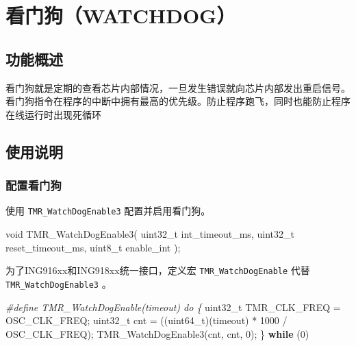\documentclass[
  12pt,
]{book}
\newenvironment{Shaded}{\begin{snugshade}}{\end{snugshade}}
\newcommand{\ControlFlowTok}[1]{\textcolor[rgb]{0.13,0.29,0.53}{\textbf{#1}}}
\newcommand{\DataTypeTok}[1]{\textcolor[rgb]{0.13,0.29,0.53}{#1}}
\newcommand{\DecValTok}[1]{\textcolor[rgb]{0.00,0.00,0.81}{#1}}
\newcommand{\NormalTok}[1]{#1}
\newcommand{\PreprocessorTok}[1]{\textcolor[rgb]{0.56,0.35,0.01}{\textit{#1}}}
\begin{document}
\hypertarget{ch-watchdog}{%
\chapter{看门狗（WATCHDOG）}\label{ch-watchdog}}

\hypertarget{ux529fux80fdux6982ux8ff0-8}{%
\section{功能概述}\label{ux529fux80fdux6982ux8ff0-8}}

看门狗就是定期的查看芯片内部情况，一旦发生错误就向芯片内部发出重启信号。
看门狗指令在程序的中断中拥有最高的优先级。防止程序跑飞，同时也能防止程序在线运行时出现死循环

\hypertarget{ux4f7fux7528ux8bf4ux660e-9}{%
\section{使用说明}\label{ux4f7fux7528ux8bf4ux660e-9}}

\hypertarget{ux914dux7f6eux770bux95e8ux72d7}{%
\subsection{配置看门狗}\label{ux914dux7f6eux770bux95e8ux72d7}}

使用 \texttt{TMR\_WatchDogEnable3} 配置并启用看门狗。

\begin{Shaded}
\begin{Highlighting}[]
\DataTypeTok{void}\NormalTok{ TMR_WatchDogEnable3(}
  \DataTypeTok{uint32_t}\NormalTok{ int_timeout_ms, }
  \DataTypeTok{uint32_t}\NormalTok{ reset_timeout_ms, }
  \DataTypeTok{uint8_t}\NormalTok{ enable_int}
\NormalTok{  );}
\end{Highlighting}
\end{Shaded}

为了ING916xx和ING918xx统一接口，定义宏 \texttt{TMR\_WatchDogEnable} 代替 \texttt{TMR\_WatchDogEnable3} 。

\begin{Shaded}
\begin{Highlighting}[]
\PreprocessorTok{#define TMR_WatchDogEnable(timeout) do \{ }
  \DataTypeTok{uint32_t}\NormalTok{ TMR_CLK_FREQ = OSC_CLK_FREQ; }
  \DataTypeTok{uint32_t}\NormalTok{ cnt = ((}\DataTypeTok{uint64_t}\NormalTok{)(timeout) * }\DecValTok{1000}\NormalTok{ / OSC_CLK_FREQ); }
\NormalTok{  TMR_WatchDogEnable3(cnt, cnt, }\DecValTok{0}\NormalTok{); }
\NormalTok{  \} }\ControlFlowTok{while}\NormalTok{ (}\DecValTok{0}\NormalTok{)}
\end{Highlighting}
\end{Shaded}
\end{document}
